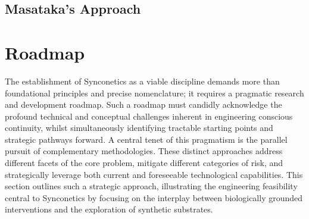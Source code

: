 \documentclass[10pt]{article}
\begin{document}
\begin{sloppypar}
  \subsection{Masataka's Approach}
  \label{sec:masataka-approach}


  \section{Roadmap}
  \label{sec:roadmap}

  The establishment of Synconetics as a viable discipline demands more than foundational principles and precise nomenclature; it requires a pragmatic research and development roadmap. Such a roadmap must candidly acknowledge the profound technical and conceptual challenges inherent in engineering conscious continuity, whilst simultaneously identifying tractable starting points and strategic pathways forward. A central tenet of this pragmatism is the parallel pursuit of complementary methodologies. These distinct approaches address different facets of the core problem, mitigate different categories of risk, and strategically leverage both current and foreseeable technological capabilities. This section outlines such a strategic approach, illustrating the engineering feasibility central to Synconetics by focusing on the interplay between biologically grounded interventions and the exploration of synthetic substrates.


\end{sloppypar}
\end{document}
